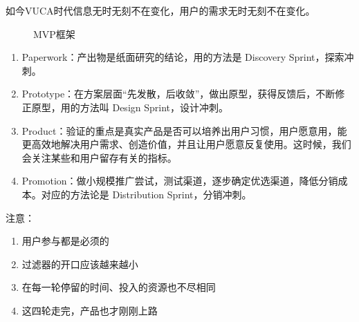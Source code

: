 \documentclass[letterpaper,11pt,english]{sphinxmanual}
\begin{document}
如今VUCA时代信息无时无刻不在变化，用户的需求无时无刻不在变化。

\begin{figure}[H]
\centering
\capstart

\noindent{}
\caption{MVP框架}\label{\detokenize{chapter_skill/BRD:id18}}\end{figure}
\begin{enumerate}
%
\item {} 
Paperwork：产出物是纸面研究的结论，用的方法是 Discovery
Sprint，探索冲刺。

\item {} 
Prototype：在方案层面“先发散，后收敛”，做出原型，获得反馈后，不断修正原型，用的方法叫
Design Sprint，设计冲刺。

\item {} 
Product：验证的重点是真实产品是否可以培养出用户习惯，用户愿意用，能更高效地解决用户需求、创造价值，并且让用户愿意反复使用。这时候，我们会关注某些和用户留存有关的指标。

\item {} 
Promotion：做小规模推广尝试，测试渠道，逐步确定优选渠道，降低分销成本。对应的方法论是
Distribution Sprint，分销冲刺。

\end{enumerate}

注意：
\begin{enumerate}
%
\item {} 
用户参与都是必须的

\item {} 
过滤器的开口应该越来越小

\item {} 
在每一轮停留的时间、投入的资源也不尽相同

\item {} 
这四轮走完，产品也才刚刚上路

\end{enumerate}
\end{document}
